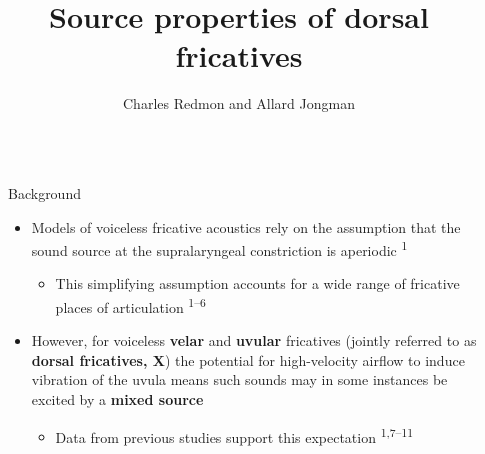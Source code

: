 \documentclass[final]{beamer}
\title{Source properties of dorsal fricatives} %
\author{Charles Redmon and Allard Jongman}
\institute{Department of Linguistics, University of Kansas} %
\newlength{\sepwid}
\newlength{\onecolwid}
\begin{document}

\setlength{\belowcaptionskip}{2ex} %
\setlength\belowdisplayshortskip{2ex} %

\begin{frame}[t] %

\begin{columns}[t] %

\begin{column}{\sepwid}\end{column} %

\begin{column}{\onecolwid} %


\begin{block}{Background}
  \begin{itemize}
    \item Models of voiceless fricative acoustics rely on the assumption that the sound source at the supralaryngeal constriction is aperiodic\textsuperscript{\color{blue} 1} 
      \begin{itemize}
        \item This simplifying assumption accounts for a wide range of fricative places of articulation\textsuperscript{\color{blue} 1--6}
      \end{itemize}
    \item However, for voiceless \textbf{velar}  and \textbf{uvular}  fricatives (jointly referred to as \textbf{dorsal fricatives, X}) the potential for high-velocity airflow to induce vibration of the uvula means such sounds may in some instances be excited by a \textbf{mixed source}
      \begin{itemize}
        \item Data from previous studies support this expectation\textsuperscript{\color{blue} 1,7--11}
      \end{itemize}
  \end{itemize}
\end{block}


\end{column}
\end{columns}
\end{frame}
\end{document}
